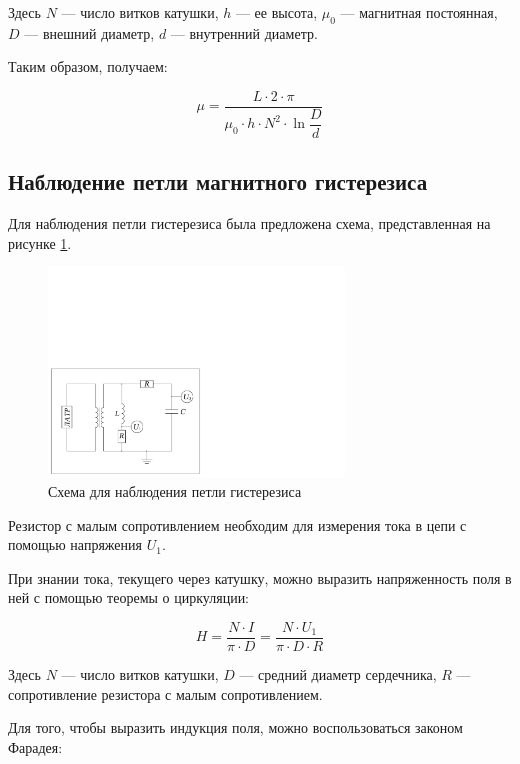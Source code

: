 \documentclass[a4paper, 12pt]{article}
\begin{document}
Здесь $N$ --- число витков катушки, $h$ --- ее высота, $\mu_0$ --- магнитная постоянная, $D$ --- внешний диаметр, $d$ --- внутренний диаметр.

Таким образом, получаем:

\begin{equation}
	\label{eq:chi}
	\mu = \frac{L \cdot 2 \cdot \pi}{\mu_0 \cdot h \cdot N^2 \cdot \ln \dfrac{D}{d}}
\end{equation}

\subsection{Наблюдение петли магнитного гистерезиса}

Для наблюдения петли гистерезиса была предложена схема, представленная на рисунке \ref{fig:circuit_loop}.

\begin{figure}[H]
	\centering
	\includegraphics[width=0.7\textwidth]{Hysteresis_circuit_1}
	\caption{Схема для наблюдения петли гистерезиса}
	\label{fig:circuit_loop}
\end{figure}

Резистор с малым сопротивлением необходим для измерения тока в цепи с помощью напряжения $U_1$. 

При знании тока, текущего через катушку, можно выразить напряженность поля в ней с помощью теоремы о циркуляции:

\begin{equation}
	\label{eq:H}
	H = \frac{N \cdot I}{\pi\cdot D} = \frac{N \cdot U_1}{\pi\cdot D\cdot R}
\end{equation}

Здесь $N$ --- число витков катушки, $D$ --- средний диаметр сердечника, $R$ --- сопротивление резистора с малым сопротивлением.

Для того, чтобы выразить индукция поля, можно воспользоваться законом Фарадея:
\end{document}
